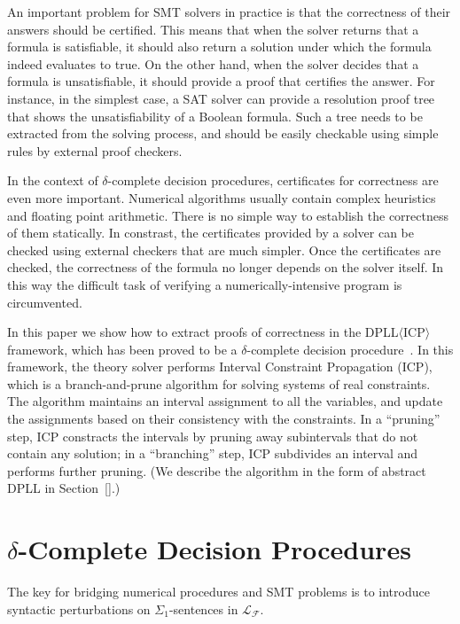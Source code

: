 \documentclass[envcountsect]{llncs}
\begin{document}
An important problem for SMT solvers in practice is that the correctness of
their answers should be certified. This means that when the solver returns that
a formula is satisfiable, it should also return a solution under which the
formula indeed evaluates to true. On the other hand, when the solver
decides that a formula is unsatisfiable, it should provide a proof that
certifies the answer. For instance, in the simplest case, a SAT solver can
provide a resolution proof tree that shows the unsatisfiability of a Boolean
formula. Such a tree needs to be extracted from the solving process, and should
be easily checkable using simple rules by external proof checkers. 

In the context of $\delta$-complete decision procedures, certificates for
correctness are even more important. Numerical algorithms usually contain
complex heuristics and floating point arithmetic. There is no simple way to
establish the correctness of them statically. In constrast, the certificates
provided by a solver can be checked using external checkers that are much
simpler. Once the certificates are checked, the correctness of the formula no
longer depends on the solver itself. In this way the difficult task of verifying
a numerically-intensive program is circumvented. 

In this paper we show how to extract proofs of correctness in the
DPLL$\langle$ICP$\rangle$ framework, which has been proved to be a
$\delta$-complete decision procedure~\cite{}. In this framework, the theory
solver performs Interval Constraint Propagation (ICP), which is a
branch-and-prune algorithm for solving systems of real constraints. The
algorithm maintains an interval assignment to all the variables, and update the 
assignments based on their consistency with the constraints. In a ``pruning''
step, ICP constracts the intervals by pruning away subintervals that do not
contain any solution; in a ``branching'' step, ICP subdivides an interval and
performs further pruning. (We describe the algorithm in the form of abstract
DPLL in Section~\ref{}.)



\section{$\delta$-Complete Decision Procedures}\label{review}

The key for bridging numerical procedures and SMT problems is to introduce
syntactic perturbations on $\Sigma_1$-sentences in $\mathcal{L}_{\mathcal{F}}$. 
\end{document}
